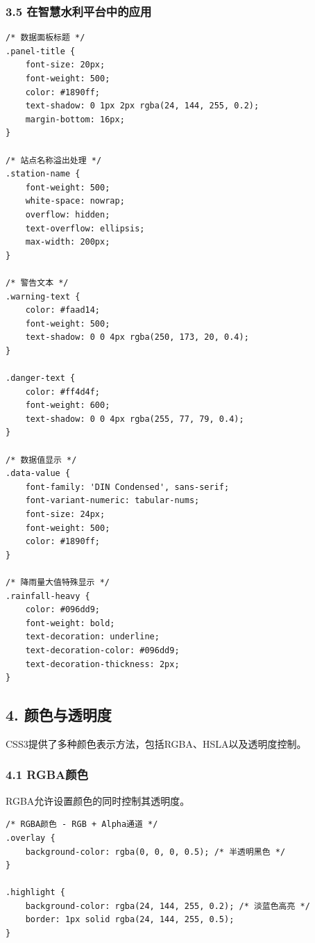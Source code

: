 \subsubsection{3.5
在智慧水利平台中的应用}\label{ux5728ux667aux6167ux6c34ux5229ux5e73ux53f0ux4e2dux7684ux5e94ux7528-4}

\begin{lstlisting}
/* 数据面板标题 */
.panel-title {
    font-size: 20px;
    font-weight: 500;
    color: #1890ff;
    text-shadow: 0 1px 2px rgba(24, 144, 255, 0.2);
    margin-bottom: 16px;
}

/* 站点名称溢出处理 */
.station-name {
    font-weight: 500;
    white-space: nowrap;
    overflow: hidden;
    text-overflow: ellipsis;
    max-width: 200px;
}

/* 警告文本 */
.warning-text {
    color: #faad14;
    font-weight: 500;
    text-shadow: 0 0 4px rgba(250, 173, 20, 0.4);
}

.danger-text {
    color: #ff4d4f;
    font-weight: 600;
    text-shadow: 0 0 4px rgba(255, 77, 79, 0.4);
}

/* 数据值显示 */
.data-value {
    font-family: 'DIN Condensed', sans-serif;
    font-variant-numeric: tabular-nums;
    font-size: 24px;
    font-weight: 500;
    color: #1890ff;
}

/* 降雨量大值特殊显示 */
.rainfall-heavy {
    color: #096dd9;
    font-weight: bold;
    text-decoration: underline;
    text-decoration-color: #096dd9;
    text-decoration-thickness: 2px;
}
\end{lstlisting}

\subsection{4. 颜色与透明度}\label{ux989cux8272ux4e0eux900fux660eux5ea6}

CSS3提供了多种颜色表示方法，包括RGBA、HSLA以及透明度控制。

\subsubsection{4.1 RGBA颜色}\label{rgbaux989cux8272}

RGBA允许设置颜色的同时控制其透明度。

\begin{lstlisting}
/* RGBA颜色 - RGB + Alpha通道 */
.overlay {
    background-color: rgba(0, 0, 0, 0.5); /* 半透明黑色 */
}

.highlight {
    background-color: rgba(24, 144, 255, 0.2); /* 淡蓝色高亮 */
    border: 1px solid rgba(24, 144, 255, 0.5);
}
\end{lstlisting}

